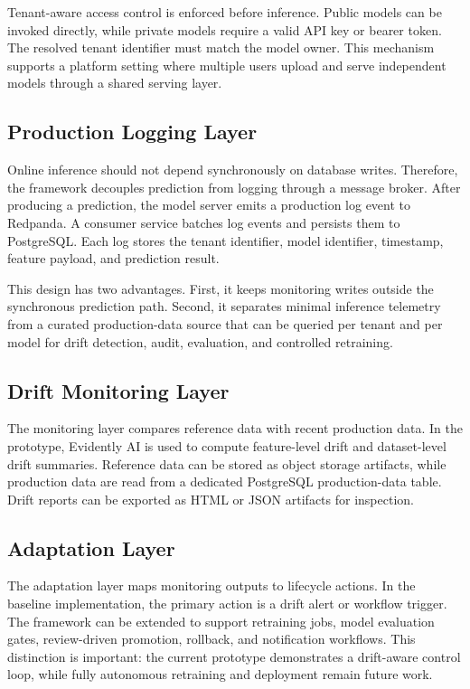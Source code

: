 \documentclass[runningheads]{llncs}
\begin{document}
Tenant-aware access control is enforced before inference. Public models can be invoked directly, while private models require a valid API key or bearer token. The resolved tenant identifier must match the model owner. This mechanism supports a platform setting where multiple users upload and serve independent models through a shared serving layer.

\subsection{Production Logging Layer}

Online inference should not depend synchronously on database writes. Therefore, the framework decouples prediction from logging through a message broker. After producing a prediction, the model server emits a production log event to Redpanda. A consumer service batches log events and persists them to PostgreSQL. Each log stores the tenant identifier, model identifier, timestamp, feature payload, and prediction result.

This design has two advantages. First, it keeps monitoring writes outside the synchronous prediction path. Second, it separates minimal inference telemetry from a curated production-data source that can be queried per tenant and per model for drift detection, audit, evaluation, and controlled retraining.

\subsection{Drift Monitoring Layer}

The monitoring layer compares reference data with recent production data. In the prototype, Evidently AI is used to compute feature-level drift and dataset-level drift summaries. Reference data can be stored as object storage artifacts, while production data are read from a dedicated PostgreSQL production-data table. Drift reports can be exported as HTML or JSON artifacts for inspection.

\subsection{Adaptation Layer}

The adaptation layer maps monitoring outputs to lifecycle actions. In the baseline implementation, the primary action is a drift alert or workflow trigger. The framework can be extended to support retraining jobs, model evaluation gates, review-driven promotion, rollback, and notification workflows. This distinction is important: the current prototype demonstrates a drift-aware control loop, while fully autonomous retraining and deployment remain future work.
\end{document}
